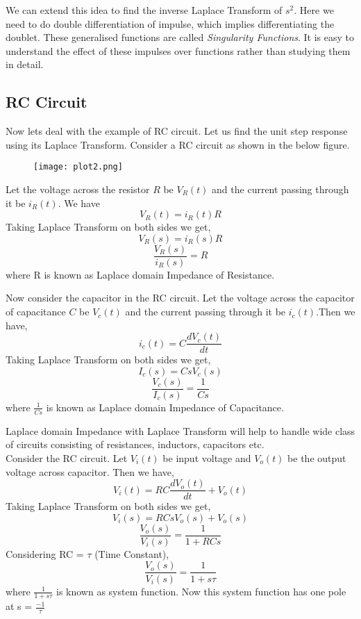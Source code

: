 \noindent
We can extend this idea to find the inverse Laplace Transform of $s^2$. Here we need to do double differentiation of impulse, which implies differentiating the doublet. These generalised functions are called \emph{Singularity Functions}. It is easy to understand the effect of these impulses over functions rather than studying them in detail.\\

\subsection{RC Circuit}

\noindent
Now lets deal with the example of RC circuit. Let us find the unit step response using its Laplace Transform. Consider a RC circuit as shown in the below figure.\\
\begin{figure}[h!]
\begin{center}
\texttt{[image: plot2.png]}
\end{center}
\end{figure}

\noindent
Let the voltage across the resistor $R$ be $V_R(t)$ and the current passing through it be $i_R(t)$. We have\\
		\[ V_R(t) = i_R(t)R\]
        Taking Laplace Transform on both sides we get,
        \[ V_R(s) = i_R(s)R\]
        \[ \frac{V_R(s)}{i_R(s)} = R \]
        where R is known as Laplace domain Impedance of Resistance.
      
\noindent
Now consider the capacitor in the RC circuit. Let the voltage across the capacitor of capacitance $C$ be $V_c(t)$ and the current passing through it be $i_c(t)$.Then we have,\\
		\[  i_c(t) = C\frac{dV_c(t)}{dt}\]
        Taking Laplace Transform on both sides we get,
        \[  I_c(s) = CsV_c(s)\] 
        \[  \frac{V_c(s)}{I_c(s)} = \frac{1}{Cs}\]
        where $\frac{1}{Cs}$ is known as Laplace domain Impedance of Capacitance.
        
\noindent
Laplace domain Impedance with Laplace Transform will help to handle wide class of circuits consisting of resistances, inductors, capacitors etc.\\

\noindent
Consider the RC circuit. Let $V_i(t)$ be input voltage and $V_o(t)$ be the output voltage across capacitor. Then we have,
\[  V_i(t) = RC\frac{dV_o(t)}{dt} + V_o(t)\]
Taking Laplace Transform on both sides we get,
\[  V_i(s) = RCsV_o(s) + V_o(s)\]
\[  \frac{V_o(s)}{V_i(s)} = \frac{1}{1+RCs}\] 
Considering RC = $\tau$ (Time Constant),
\[  \frac{V_o(s)}{V_i(s)} = \frac{1}{1+s\tau}\] 
where $\frac{1}{1+s\tau}$ is known as system function. Now this system function has one pole at s = $\frac{-1}{\tau}$

